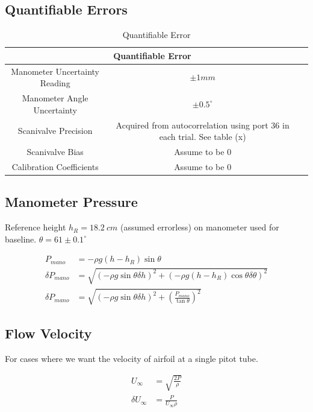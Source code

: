 \documentclass[runningheads]{llncs}
\begin{document}
\subsection{Quantifiable Errors}
\begin{table}[H]
    \begin{tabular}{|c|c|c|}
        \hline
        \multicolumn{2}{|c|}{Quantifiable Error}\\
        \hline
        Manometer Uncertainty Reading & $\pm 1 mm$\\
        \hline
        Manometer Angle Uncertainty & $\pm 0.5^\circ$ \\
        \hline
        Scanivalve Precision & Acquired from autocorrelation using port 36 in each trial. See table (x)\\
        \hline
        Scanivalve Bias & Assume to be 0 \\
        \hline
        Calibration Coefficients & Assume to be 0\\
        \hline
        
    \end{tabular}
    \caption{Quantifiable Error}
    \label{tab:quant_error}
\end{table}

\subsection{Manometer Pressure}

Reference height $h_R = 18.2 \ \si{cm}$ (assumed errorless) on manometer used for baseline. $\theta = 61 \pm 0.1^\circ$

\begin{align*}
    P_{mano} &= -\rho g (h - h_R) \sin\theta\\
    \delta P_{mano} &= \sqrt{\left(-\rho g \sin \theta \delta h\right)^2 + \left(-\rho g  (h-h_R)\cos\theta \delta \theta\right)^2}\\
    \delta P_{mano} &= \sqrt{\left(-\rho g \sin \theta \delta h\right)^2 + \left(\frac{P_{mano}}{\tan \theta}\right)^2}
\end{align*}

\subsection{Flow Velocity}

For cases where we want the velocity of airfoil at a single pitot tube.

\begin{align*}
    U_\infty &=  \sqrt{\frac{2 P}{\rho}} \\
    \delta U_\infty &= \frac{P}{U_\infty \rho}
\end{align*}
\end{document}
